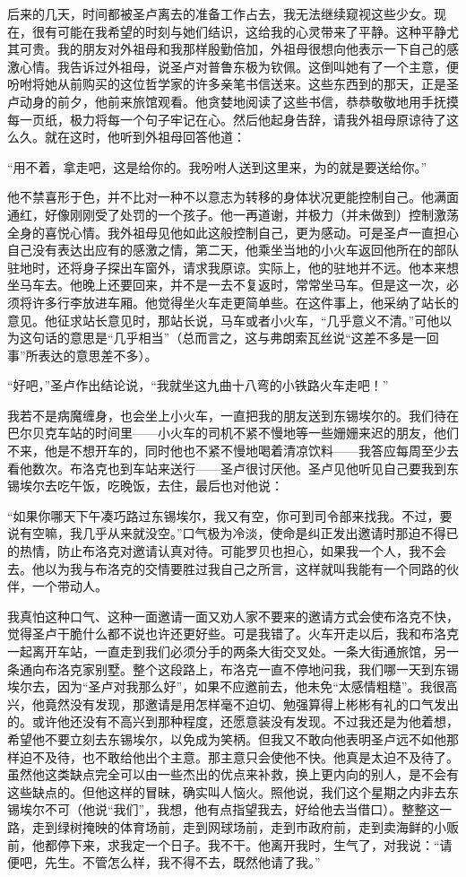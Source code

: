 \par 后来的几天，时间都被圣卢离去的准备工作占去，我无法继续窥视这些少女。现在，很有可能在我希望的时刻与她们结识，这给我的心灵带来了平静。这种平静尤其可贵。我的朋友对外祖母和我那样殷勤倍加，外祖母很想向他表示一下自己的感激心情。我告诉过外祖母，说圣卢对普鲁东极为钦佩。这倒叫她有了一个主意，便吩咐将她从前购买的这位哲学家的许多亲笔书信送来。这些东西到的那天，正是圣卢动身的前夕，他前来旅馆观看。他贪婪地阅读了这些书信，恭恭敬敬地用手抚摸每一页纸，极力将每一个句子牢记在心。然后他起身告辞，请我外祖母原谅待了这么久。就在这时，他听到外祖母回答他道：
\par “用不着，拿走吧，这是给你的。我吩咐人送到这里来，为的就是要送给你。”
\par 他不禁喜形于色，并不比对一种不以意志为转移的身体状况更能控制自己。他满面通红，好像刚刚受了处罚的一个孩子。他一再道谢，并极力（并未做到）控制激荡全身的喜悦心情。我外祖母见他如此这般控制自己，更为感动。可是圣卢一直担心自己没有表达出应有的感激之情，第二天，他乘坐当地的小火车返回他所在的部队驻地时，还将身子探出车窗外，请求我原谅。实际上，他的驻地并不远。他本来想坐马车去。他晚上还要回来，并不是一去不复返时，常常坐马车。但是这一次，必须将许多行李放进车厢。他觉得坐火车走更简单些。在这件事上，他采纳了站长的意见。他征求站长意见时，那站长说，马车或者小火车，“几乎意义不清。”可他以为这句话的意思是“几乎相当”（总而言之，这与弗朗索瓦丝说“这差不多是一回事”所表达的意思差不多）。
\par “好吧，”圣卢作出结论说，“我就坐这九曲十八弯的小铁路火车走吧！”
\par 我若不是病魔缠身，也会坐上小火车，一直把我的朋友送到东锡埃尔的。我们待在巴尔贝克车站的时间里——小火车的司机不紧不慢地等一些姗姗来迟的朋友，他们不来，他是不想开车的，同时他也不紧不慢地喝着清凉饮料——我答应每周至少去看他数次。布洛克也到车站来送行——圣卢很讨厌他。圣卢见他听见自己要我到东锡埃尔去吃午饭，吃晚饭，去住，最后也对他说：
\par “如果你哪天下午凑巧路过东锡埃尔，我又有空，你可到司令部来找我。不过，要说有空嘛，我几乎从来就没空。”口气极为冷淡，使命是纠正发出邀请时那迫不得已的热情，防止布洛克对邀请认真对待。可能罗贝也担心，如果我一个人，我不会去。他以为我与布洛克的交情要胜过我自己之所言，这样就叫我能有一个同路的伙伴，一个带动人。
\par 我真怕这种口气、这种一面邀请一面又劝人家不要来的邀请方式会使布洛克不快，觉得圣卢干脆什么都不说也许还更好些。可是我错了。火车开走以后，我和布洛克一起离开车站，一直走到我们必须分手的两条大街交叉处。一条大街通旅馆，另一条通向布洛克家别墅。整个这段路上，布洛克一直不停地问我，我们哪一天到东锡埃尔去，因为“圣卢对我那么好”，如果不应邀前去，他未免“太感情粗糙”。我很高兴，他竟然没有发现，那邀请是用怎样毫不迫切、勉强算得上彬彬有礼的口气发出的。或许他还没有不高兴到那种程度，还愿意装没有发现。不过我还是为他着想，希望他不要立刻去东锡埃尔，以免成为笑柄。但我又不敢向他表明圣卢远不如他那样迫不及待，也不敢给他出个主意。那主意只会使他不快。他真是太迫不及待了。虽然他这类缺点完全可以由一些杰出的优点来补救，换上更内向的别人，是不会有这些缺点的。但他这样的冒昧，确实叫人恼火。照他说，我们这个星期之内非去东锡埃尔不可（他说“我们”，我想，他有点指望我去，好给他去当借口）。整整这一路，走到绿树掩映的体育场前，走到网球场前，走到市政府前，走到卖海鲜的小贩前，他都停下来，求我定一个日子。我不干。他离开我时，生气了，对我说：“请便吧，先生。不管怎么样，我不得不去，既然他请了我。”

